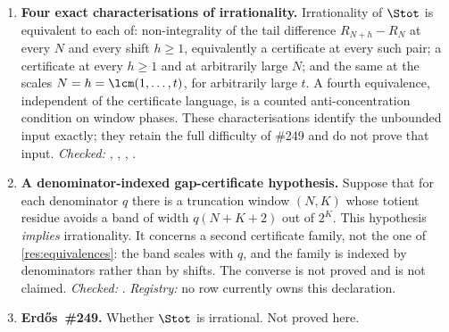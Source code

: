 {\begin{enumerate}[label=\textbf{R\arabic*.},ref=R\arabic*,leftmargin=2.4em,
  itemsep=0.2em,topsep=0.25em]
\item\label{res:equivalences} 
\textbf{Four exact characterisations of irrationality.}  Irrationality
of $\Stot$ is equivalent to each of: non-integrality of the tail difference
$R_{N+h}-R_N$ at every $N$ and every shift $h\ge1$, equivalently a certificate
at every such pair; a certificate at every $h\ge1$ and at arbitrarily large
$N$; and the same at the scales $N=h=\lcm(1,\dots,t)$, for arbitrarily large
$t$.  A fourth equivalence,
independent of the certificate language, is a counted anti-concentration
condition on window phases.  These characterisations identify the unbounded
input exactly; they retain the full difficulty of \#249 and do not prove that
input.
{\footnotesize\emph{Checked:}
,
,
,
.}

\item\label{res:supply} 
\textbf{A denominator-indexed gap-certificate hypothesis.}  Suppose that for
each denominator $q$ there is a truncation window $(N,K)$ whose totient residue
avoids a band of width $q(N{+}K{+}2)$ out of $2^K$.  This hypothesis
\emph{implies} irrationality.  It concerns a second certificate family, not
the one of \ref{res:equivalences}: the band scales with $q$, and the family is
indexed by denominators rather than by shifts.  The converse is not proved and
is not claimed.
{\footnotesize\emph{Checked:}
.
\emph{Registry:} no row currently owns this declaration.}

\item\label{res:open} 
\textbf{Erd\H{o}s~\#249.}  Whether $\Stot$ is irrational.  Not proved here.

\end{enumerate}
}



